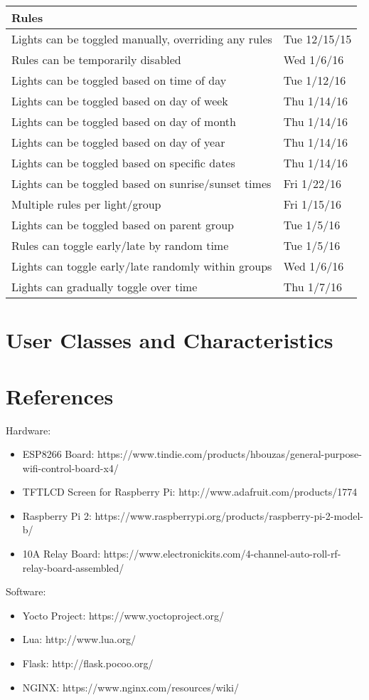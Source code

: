 \documentclass[oneside,openright]{book}
\begin{document}
\begin{tabular}{ | l | l | }
   Rules & \\ \hline
   
   Lights can be toggled manually, overriding any rules & Tue 12/15/15 \\ \hline
   Rules can be temporarily disabled & Wed 1/6/16 \\ \hline
   Lights can be toggled based on time of day & Tue 1/12/16 \\ \hline
   Lights can be toggled based on day of week & Thu 1/14/16 \\ \hline
   Lights can be toggled based on day of month & Thu 1/14/16 \\ \hline
   Lights can be toggled based on day of year & Thu 1/14/16 \\ \hline
   Lights can be toggled based on specific dates & Thu 1/14/16 \\ \hline
   Lights can be toggled based on sunrise/sunset times & Fri 1/22/16 \\ \hline
   Multiple rules per light/group & Fri 1/15/16 \\ \hline
   Lights can be toggled based on parent group & Tue 1/5/16 \\ \hline
   Rules can toggle early/late by random time & Tue 1/5/16 \\ \hline
   Lights can toggle early/late randomly within groups & Wed 1/6/16 \\ \hline
   Lights can gradually toggle over time & Thu 1/7/16 \\ \hline
\end{tabular}

\section{User Classes and Characteristics}


\section{References}

Hardware:
\begin{itemize}
\item ESP8266 Board: https://www.tindie.com/products/hbouzas/general-purpose-wifi-control-board-x4/
\item TFTLCD Screen for Raspberry Pi: http://www.adafruit.com/products/1774
\item Raspberry Pi 2: https://www.raspberrypi.org/products/raspberry-pi-2-model-b/
\item 10A Relay Board: https://www.electronickits.com/4-channel-auto-roll-rf-relay-board-assembled/
\end{itemize}
Software:
\begin{itemize}
\item Yocto Project: https://www.yoctoproject.org/
\item Lua: http://www.lua.org/
\item Flask: http://flask.pocoo.org/
\item NGINX: https://www.nginx.com/resources/wiki/
\end{itemize}
\end{document}

